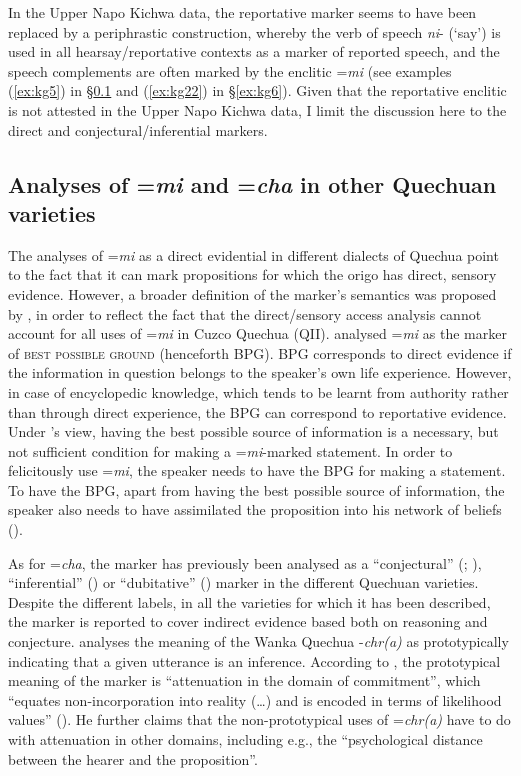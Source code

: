 \documentclass[output=paper]{langscibook}
\begin{document}
In the Upper Napo Kichwa data, the reportative marker  seems to have been replaced by a periphrastic construction, whereby the verb of speech \textit{ni}- (‘say’) is used in all hearsay/reportative contexts as a marker of reported speech, and the speech complements are often marked by the enclitic =\textit{mi} (see examples (\ref{ex:kg5}) in §‎\ref{s:kg3-2} and (\ref{ex:kg22}) in §‎\ref{ex:kg6}). Given that the reportative enclitic is not attested in the Upper Napo Kichwa data, I limit the discussion here to the direct and conjectural/inferential markers.


\subsection{Analyses of =\textit{mi} and =\textit{cha} in other Quechuan varieties}\label{s:kg3-2}

The analyses of =\textit{mi} as a direct evidential in different dialects of Quechua point to the fact that it can mark propositions for which the origo has direct, sensory evidence. However, a broader definition of the marker’s semantics was proposed by \cite{Faller2002}, in order to reflect the fact that the direct/sensory access analysis cannot account for all uses of =\textit{mi} in Cuzco Quechua (QII). \cite{Faller2002} analysed =\textit{mi} as the marker of \textsc{best possible ground} (henceforth BPG). BPG corresponds to direct evidence if the information in question belongs to the speaker’s own life experience. However, in case of encyclopedic knowledge, which tends to be learnt from authority rather than through direct experience, the BPG can correspond to reportative evidence. Under \citeauthor{Faller2002}’s view, having the best possible source of information is a necessary, but not sufficient condition for making a =\textit{mi}-marked statement. In order to felicitously use =\textit{mi}, the speaker needs to have the BPG for making a statement. To have the BPG, apart from having the best possible source of information, the speaker also needs to have assimilated the proposition into his network of beliefs (\citealt[140--141]{Faller2002}).

As for =\textit{cha}, the marker has previously been analysed as a “conjectural” (\citealt{Weber1986}; \citealt{Faller2002}), “inferential” (\citealt{Floyd1997}) or “dubitative” (\citealt{Muysken1995}) marker in the different Quechuan varieties. Despite the different labels, in all the varieties for which it has been described, the marker is reported to cover indirect evidence based both on reasoning and conjecture. \cite[ch.5]{Floyd1997} analyses the meaning of the Wanka Quechua -\textit{chr(a)} as prototypically indicating that a given utterance is an inference. According to \citeauthor{Floyd1997}, the prototypical meaning of the marker is “attenuation in the domain of commitment”, which “equates non-incorporation into reality (…) and is encoded in terms of likelihood values” (\citealt[106]{Floyd1997}). He further claims that the non-prototypical uses of =\textit{chr(a)} have to do with attenuation in other domains, including e.g., the “psychological distance between the hearer and the proposition”.
\end{document}
